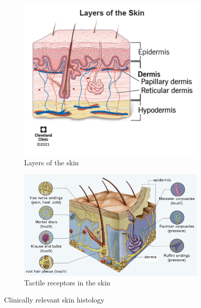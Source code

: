 \documentclass[
  12pt,
]{memoir}
\begin{document}
\begin{figure}
    \centering
    \begin{subfigure}{.4\textwidth}
        \includegraphics[width=\textwidth]{../assets/surg/skin-layers.jpg}
        \caption{Layers of the skin}
    \end{subfigure}
    \begin{subfigure}{.4\textwidth}
        \includegraphics[width=\textwidth]{../assets/surg/tactile.jpg}
        \vspace{5mm}
        \caption{Tactile receptors in the skin}
    \end{subfigure}
    \vspace{5mm}
    \caption{Clinically relevant skin histology}
\end{figure}
\end{document}
